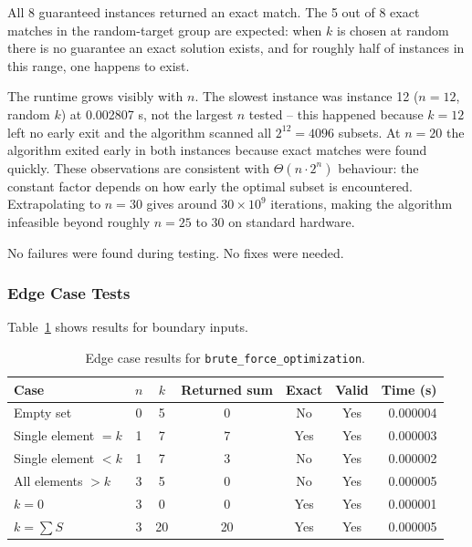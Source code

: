 \documentclass[12pt,a4paper]{article}
\theoremstyle{definition}
\begin{document}
All 8 guaranteed instances returned an exact match. The 5 out of 8 exact
matches in the random-target group are expected: when $k$ is chosen at random
there is no guarantee an exact solution exists, and for roughly half of
instances in this range, one happens to exist.

The runtime grows visibly with $n$. The slowest instance was instance 12
($n = 12$, random $k$) at 0.002807 s, not the largest $n$ tested -- this
happened because $k = 12$ left no early exit and the algorithm scanned all
$2^{12} = 4096$ subsets. At $n = 20$ the algorithm exited early in both
instances because exact matches were found quickly. These observations are
consistent with $\Theta(n \cdot 2^n)$ behaviour: the constant factor depends
on how early the optimal subset is encountered. Extrapolating to $n = 30$
gives around $30 \times 10^9$ iterations, making the algorithm infeasible
beyond roughly $n = 25$ to $30$ on standard hardware.

No failures were found during testing. No fixes were needed.

\subsubsection*{Edge Case Tests}

Table~\ref{tab:edge} shows results for boundary inputs.

\begin{table}[h!]
  \centering
  \renewcommand{\arraystretch}{1.3}
  \begin{tabular}{lcccccr}
    \toprule
    Case & $n$ & $k$ & Returned sum & Exact & Valid & Time (s) \\
    \midrule
    Empty set            & 0 & 5  & 0  & No  & Yes & 0.000004 \\
    Single element $= k$ & 1 & 7  & 7  & Yes & Yes & 0.000003 \\
    Single element $< k$ & 1 & 7  & 3  & No  & Yes & 0.000002 \\
    All elements $> k$   & 3 & 5  & 0  & No  & Yes & 0.000005 \\
    $k = 0$              & 3 & 0  & 0  & Yes & Yes & 0.000001 \\
    $k = \sum S$         & 3 & 20 & 20 & Yes & Yes & 0.000005 \\
    \bottomrule
  \end{tabular}
  \caption{Edge case results for \texttt{brute\_force\_optimization}.}
  \label{tab:edge}
\end{table}
\end{document}
